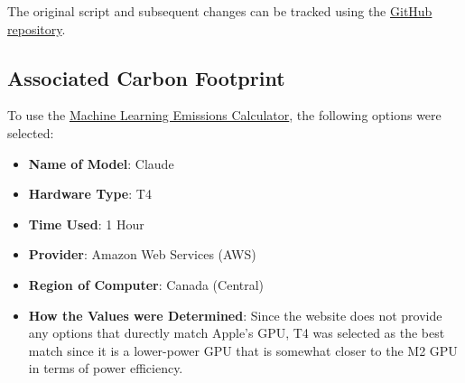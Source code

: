 \documentclass[titlepage]{article}
\begin{document}
The original script and subsequent changes can be tracked using the \href{https://github.com/SumanyaG/4NL3-NPL/tree/main/assignment-4}{GitHub repository}.

\subsection{Associated Carbon Footprint}
To use the \href{https://mlco2.github.io/impact/?#compute}{Machine Learning Emissions Calculator}, the following options were selected:
\begin{itemize}
    \item \textbf{Name of Model}: Claude
    \item \textbf{Hardware Type}: T4
    \item \textbf{Time Used}: 1 Hour
    \item \textbf{Provider}: Amazon Web Services (AWS)
    \item \textbf{Region of Computer}: Canada (Central)
    \item \textbf{How the Values were Determined}: Since the website does not provide any options that durectly match Apple's GPU, T4 was selected 
    as the best match since it is a lower-power GPU that is somewhat closer to the M2 GPU in terms of power efficiency.
\end{itemize}
\end{document}
